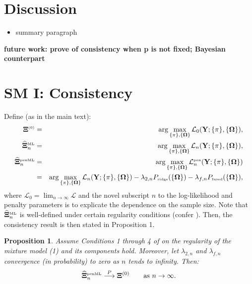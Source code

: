 \documentclass[10pt]{article}
\newtheorem{proposition}{Proposition}
\begin{document}
\section{Discussion}
\begin{itemize}
    \item summary paragraph
    \   
\end{itemize}
\textbf{future work: prove of consistency when p is not fixed; Bayesian counterpart}



\setlength{\bibsep}{2pt}
% 
% 


% 
% 

\setlength{\bibsep}{2pt}


\newpage
\section*{SM I: Consistency}
\label{SMI}
Define (as in the main text):
\begin{eqnarray*}
\mathbf{\Xi}^{\mbox{{\tiny (0)}}} & = & \arg \max_{\{\pi \}, \{\mathbf{\Omega} \}} \mathcal{L}_0(\mathbf{Y}; \{\pi \}, \{\mathbf{\Omega} \} ),
\\
\widehat{\mathbf{\Xi}}_n^{\mbox{{\tiny ML}}} & = & \arg \max_{\{\pi \}, \{\mathbf{\Omega} \}} \mathcal{L}_n(\mathbf{Y}; \{\pi \}, \{\mathbf{\Omega} \} ),
\\
\widehat{\mathbf{\Xi}}_n^{\mbox{{\tiny penML}}} & = &
\arg \max_{\{\pi \}, \{\mathbf{\Omega} \}} \mathcal{L}_n^{\mbox{{\tiny pen}} }(\mathbf{Y}; \{\pi \}, \{\mathbf{\Omega} \} )
\\
& = & \arg \max_{\{\pi \}, \{\mathbf{\Omega} \}} \mathcal{L}_n(\mathbf{Y}; \{\pi \}, \{\mathbf{\Omega} \} ) - \lambda_{2,n} P_{\mbox{{\tiny ridge}}}( \{\mathbf{\Omega} \}) - \lambda_{f,n} P_{\mbox{{\tiny fused}}}( \{\mathbf{\Omega} \}),
\end{eqnarray*}
where $\mathcal{L}_0 = \lim_{n\rightarrow \infty} \mathcal{L}$ and the novel subscript $n$ to the log-likelihood and penalty parameters is to explicate the dependence on the sample size. Note that $\widehat{\mathbf{\Xi}}_n^{\mbox{{\tiny ML}}}$ is well-defined under certain regularity conditions (confer \citealt{Redn1984}). Then, the consistency result is then stated in Proposition 1.

\begin{proposition}
Assume Conditions 1 through 4 of \cite{Redn1984} on the regularity of the mixture model (1) and its components hold. Moreover, let $\lambda_{2,n}$ and $\lambda_{f,n}$ convergence (in probability) to zero as $n$ tends to infinity. Then:
\begin{eqnarray*}
\widehat{\mathbf{\Xi}}^{\mbox{{\tiny penML}}}_n \stackrel{P}{\longrightarrow} \mathbf{\Xi}^{(0)} \qquad \mbox{as } n \rightarrow \infty.
\end{eqnarray*}
\end{proposition}
\end{document}
